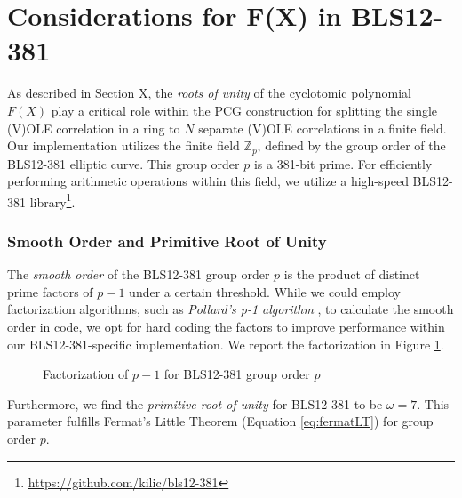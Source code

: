 \section{Considerations for F(X) in BLS12-381}
As described in Section \todo X, the \textit{roots of unity} of the cyclotomic polynomial $F(X)$ play a critical role within the PCG construction for splitting the single (V)OLE correlation in a ring to $N$ separate (V)OLE correlations in a finite field. Our implementation utilizes the finite field $\mathbb{Z}_p$, defined by the group order of the BLS12-381 elliptic curve. This group order $p$ is a 381-bit prime. For efficiently performing arithmetic operations within this field, we utilize a high-speed BLS12-381 library\footnote{\url{https://github.com/kilic/bls12-381}}.

\subsubsection{Smooth Order and Primitive Root of Unity}
The \textit{smooth order} of the BLS12-381 group order $p$ is the product of distinct prime factors of $p-1$ under a certain threshold. While we could employ factorization algorithms, such as \textit{Pollard's p-1 algorithm} \cite{pollard1974theorems}, to calculate the smooth order in code, we opt for hard coding the factors to improve performance within our BLS12-381-specific implementation. We report the factorization in Figure \ref{fig:pminus1factorization}.

\begin{figure}[htbp]
\centering
\setlength{\fboxsep}{10pt}
\caption{Factorization of \(p-1\) for BLS12-381 group order $p$}
\label{fig:pminus1factorization}
\end{figure}

Furthermore, we find the \textit{primitive root of unity} for BLS12-381 to be $\omega = 7$. This parameter fulfills Fermat's Little Theorem (Equation \ref{eq:fermatLT}) for group order $p$.

